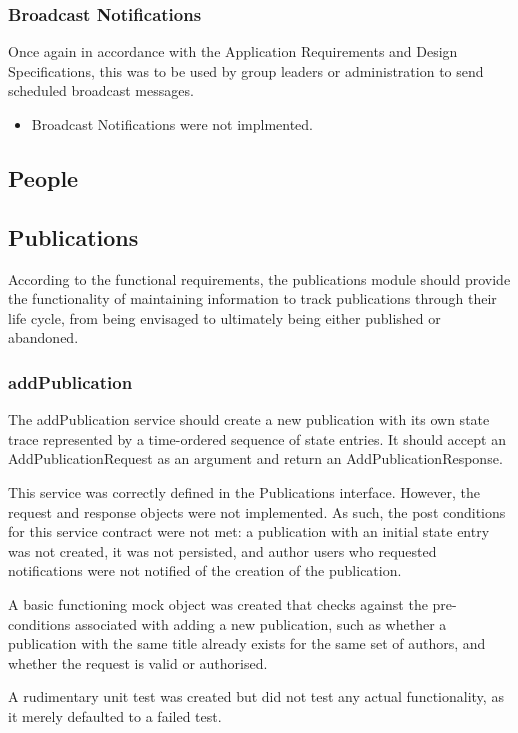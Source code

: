 \documentclass[a4paper,10pt]{article}
\begin{document}
\subsubsection{Broadcast Notifications}
Once again in accordance with the Application Requirements and Design Specifications, this was to be used by group leaders or administration to send scheduled broadcast
messages.

\begin{itemize}
	\item Broadcast Notifications were not implmented.
\end{itemize}
\subsection{People}

\subsection{Publications}
According to the functional requirements, the publications module should provide the functionality of maintaining information to track publications through their life cycle, from being envisaged to ultimately being either published or abandoned.
\subsubsection{addPublication}
The addPublication service should create a new publication with its own state trace represented by a time-ordered sequence of state entries. It should accept an AddPublicationRequest as an argument and return an AddPublicationResponse.

This service was correctly defined in the Publications interface. However, the request and response objects were not implemented. As such, the post conditions for this service contract were not met: a publication with an initial state entry was not created, it was not persisted, and author users who requested notifications were not notified of the creation of the publication.

A basic functioning mock object was created that checks against the pre-conditions associated with adding a new publication, such as whether a publication with the same title already exists for the same set of authors, and whether the request is valid or authorised.

A rudimentary unit test was created but did not test any actual functionality, as it merely defaulted to a failed test.
\end{document}
